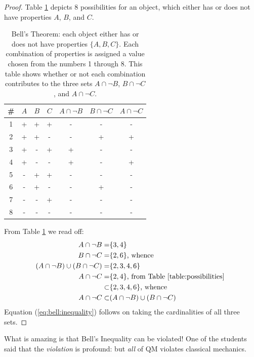 \documentclass[]{article}
\begin{document}
\begin{proof}

    Table \ref{table:possibilities} depicts 8 possibilities for an object, which either has or does not have properties $A$, $B$, and $C$.
  
	\begin{table}[H]
		\caption[Bell's Theorem]{Bell's Theorem: each object either has or does not have properties $\{A, B,  C\}$. Each combination of properties is assigned a value chosen from the numbers 1 through 8. This table shows whether or not each combination contributes to the three sets $A \cap \neg B$, $B \cap \neg C$, and $A \cap \neg C $.}\label{table:possibilities}
		\begin{center}
			\begin{tabular}{|c|c|c|c|c|c|c|} \hline
				\#&$A$&$B$&$C$&$A \cap \neg B$&$B \cap \neg C$& $A \cap \neg C $\\ \hline
				\rowcolor{Gray}
				1&+&+&+&-&-&-  \\ \hline 
				2&+&+&-&-&+&+  \\ \hline
				3&+&-&+&+&-&-  \\ \hline 
				4&+&-&-&+&-&+  \\ \hline
				\rowcolor{Gray}
				5&-&+&+&-&-&-  \\ \hline 
				6&-&+&-&-&+&-  \\ \hline
				\rowcolor{Gray}
				7&-&-&+&-&-&-  \\ \hline
				\rowcolor{Gray} 
				8&-&-&-&-&-&- \\ \hline
			\end{tabular}
		\end{center}
	\end{table}

	From Table \ref{table:possibilities} we read off:
	\begin{align*}
		A \cap \neg B =& \{3, 4\} \\
		B \cap \neg C =& \{2, 6\} \text{, whence}\\
		(A \cap \neg B) \cup (B \cap \neg C) =&\{2,3,4, 6\}\\
		A \cap \neg C =& \{2,4\} \text{, from Table \ref{table:possibilities} }\\
		\subset& \{2,3,4, 6\} \text{, whence}\\
		A \cap \neg C \subset&(A \cap \neg B) \cup (B \cap \neg C)
	\end{align*}
Equation (\ref{eq:bell:inequality}) follows on taking the cardinalities of all three sets.
\end{proof}
What is amazing is that Bell's Inequality can be violated! One of the students said that the \emph{violation} is profound: but \emph{all} of QM violates classical mechanics. 
\end{document}
